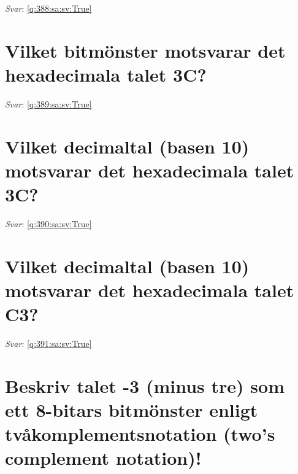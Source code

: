 \documentclass[a4paper,11pt,oneside]{book}
\begin{document}
\begin{sloppypar}
\vspace{1cm}

\textit{Svar}: \autoref{q:388:sa:sv:True}



\section{Vilket bitm\"onster motsvarar det hexadecimala talet 3C?}

\label{q:389:sa:sv:False}

\vspace{2cm}

\noindent\makebox[\textwidth]{\hrulefill}

\vspace{1cm}

\textit{Svar}: \autoref{q:389:sa:sv:True}



\section{Vilket decimaltal (basen 10) motsvarar det hexadecimala talet 3C?}

\label{q:390:sa:sv:False}

\vspace{2cm}

\noindent\makebox[\textwidth]{\hrulefill}

\vspace{1cm}

\textit{Svar}: \autoref{q:390:sa:sv:True}



\section{Vilket decimaltal (basen 10) motsvarar det hexadecimala talet C3?}

\label{q:391:sa:sv:False}

\vspace{2cm}

\noindent\makebox[\textwidth]{\hrulefill}

\vspace{1cm}

\textit{Svar}: \autoref{q:391:sa:sv:True}



\section{Beskriv talet -3 (minus tre) som ett 8-bitars bitm\"onster enligt tv\r{a}komplementsnotation (two{\textquoteright}s complement notation)!}


\end{sloppypar}
\end{document}
